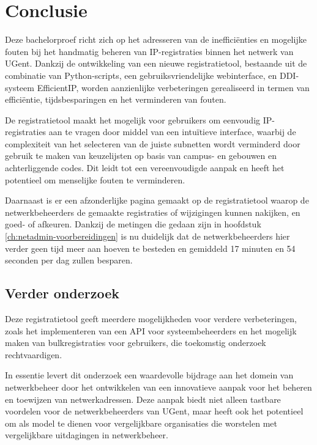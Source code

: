 
\chapter{Conclusie}%
\label{ch:conclusie}

Deze bachelorproef richt zich op het adresseren van de inefficiënties en mogelijke fouten bij het handmatig beheren van IP-registraties binnen het netwerk van UGent. Dankzij de ontwikkeling van een nieuwe registratietool, bestaande uit de combinatie van Python-scripts, een gebruiksvriendelijke webinterface, en DDI-systeem EfficientIP, worden aanzienlijke verbeteringen gerealiseerd in termen van efficiëntie, tijdsbesparingen en het verminderen van fouten.

De registratietool maakt het mogelijk voor gebruikers om eenvoudig IP-registraties aan te vragen door middel van een intuïtieve interface, waarbij de complexiteit van het selecteren van de juiste subnetten wordt verminderd door gebruik te maken van keuzelijsten op basis van campus- en gebouwen en achterliggende codes. Dit leidt tot een vereenvoudigde aanpak en heeft het potentieel om menselijke fouten te verminderen. 

Daarnaast is er een afzonderlijke pagina gemaakt op de registratietool waarop de netwerkbeheerders de gemaakte registraties of wijzigingen kunnen nakijken, en goed- of afkeuren. Dankzij de metingen die gedaan zijn in hoofdstuk \ref{ch:netadmin-voorbereidingen} is nu duidelijk dat de netwerkbeheerders hier verder geen tijd meer aan hoeven te besteden en gemiddeld 17 minuten en 54 seconden per dag zullen besparen.

\section{Verder onderzoek}
Deze registratietool geeft meerdere mogelijkheden voor verdere verbeteringen, zoals het implementeren van een API voor systeembeheerders en het mogelijk maken van bulkregistraties voor gebruikers, die toekomstig onderzoek rechtvaardigen.

In essentie levert dit onderzoek een waardevolle bijdrage aan het domein van netwerkbeheer door het ontwikkelen van een innovatieve aanpak voor het beheren en toewijzen van netwerkadressen. Deze aanpak biedt niet alleen tastbare voordelen voor de netwerkbeheerders van UGent, maar heeft ook het potentieel om als model te dienen voor vergelijkbare organisaties die worstelen met vergelijkbare uitdagingen in netwerkbeheer.




